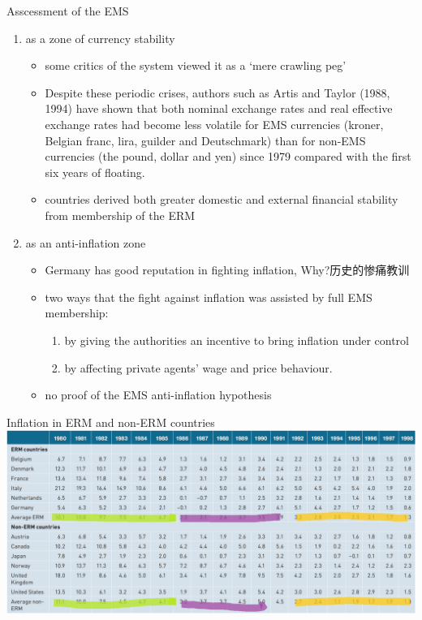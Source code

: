 \documentclass[10pt,hyperref={CJKbookmarks=true},xcolor=dvipsnames,aspectratio=169]{beamer}
\begin{document}
\begin{frame}{Asscessment of the EMS}
	\begin{enumerate}
		\item as a zone		of currency stability
		\begin{itemize}
			\item some critics of the system viewed it as a ‘mere			crawling peg’
			\item Despite these periodic crises, authors such as Artis and Taylor (1988, 1994)
			have shown that both nominal exchange rates and real effective exchange rates
			had become less volatile for EMS currencies (kroner, Belgian franc, lira, guilder and
			Deutschmark) than for non-EMS currencies (the pound, dollar and yen) since 1979
			compared with the first six years of floating. 
			\item countries derived both greater domestic and external financial
			stability from membership of the ERM
			
		\end{itemize}
		\item   as an anti-inflation zone
		\begin{itemize}
			\item Germany has good reputation in fighting inflation, Why?历史的惨痛教训
			\item two ways that
			the fight against inflation was assisted by full EMS membership: 
			\begin{enumerate}
				\item by giving the
				authorities an incentive to bring inflation under control
				\item by affecting private
				agents’ wage and price behaviour.
			\end{enumerate}
		\item no proof of the EMS anti-inflation
		hypothesis
		\end{itemize}
	\end{enumerate}
\end{frame}
\begin{frame}{Inflation in ERM and non-ERM countries}
		\centering
\includegraphics[scale=0.42]{fig/euro/inflation}
\end{frame}
\end{document}
